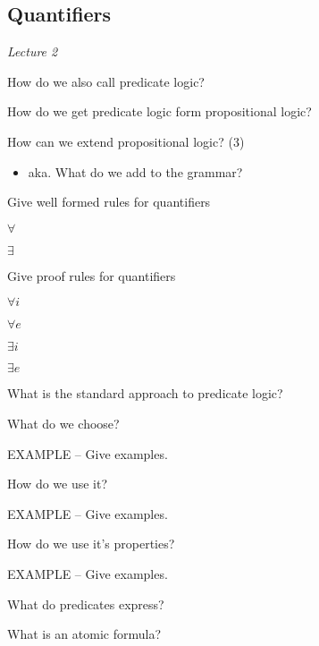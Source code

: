 \documentclass[fleqn]{article}
\begin{document}
\subsection{Quantifiers}
\textit{Lecture 2}
\begin{enumerate}
    \item How do we also call predicate logic?
    \item How do we get predicate logic form propositional logic?
    {\color{red}\item How can we extend propositional logic? (3)}
    \begin{itemize}
        \item aka. What do we add to the grammar?
    \end{itemize}
    {\color{red}\item Give well formed rules for quantifiers}
    \begin{itemize}
        {\color{blue}\item $\forall$}
        {\color{red}\item $\exists$}
    \end{itemize}
    {\color{red}\item Give proof rules for quantifiers}
    \begin{itemize}
        {\color{green}\item $\forall i$}
        {\color{red}\item $\forall e$}
        {\color{green}\item $\exists i$}
        {\color{green}\item $\exists e$}
    \end{itemize}
    {\color{red}\item What is the standard approach to predicate logic?}
    \begin{itemize}
        {\color{red}\item What do we choose?}
        {\color{red}\item EXAMPLE -- Give examples.}
        {\color{red}\item How do we use it?}
        {\color{blue}\item EXAMPLE -- Give examples.}
        {\color{red}\item How do we use it's properties?}
        {\color{red}\item EXAMPLE -- Give examples.}
        {\color{blue}\item What do predicates express?}
    \end{itemize}
    {\color{red}\item What is an atomic formula?}

\end{enumerate}
\end{document}
